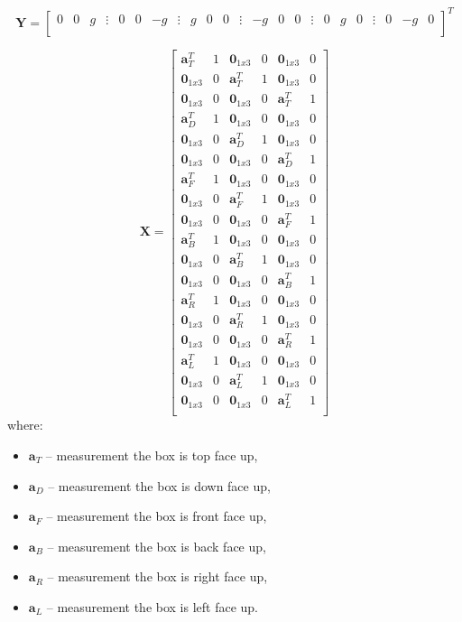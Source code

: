 \begin{equation}
	\bm{Y} = \begin{bmatrix} 0 & 0 & g & \vdots & 0 & 0 & -g & \vdots & g & 0 & 0 & \vdots & -g & 0 & 0  & \vdots& 0 & g & 0 & \vdots & 0 & -g & 0 \\
	\end{bmatrix}^T
	\label{ols_y}
\end{equation}

\begin{equation}
	\bm{X} = 
	\begin{bmatrix}
	\bm{a}^T_T & 1 & \bm{0}_{1x3} & 0 & \bm{0}_{1x3} & 0\\
	\bm{0}_{1x3} & 0 & \bm{a}^T_T & 1 & \bm{0}_{1x3} & 0\\
	\bm{0}_{1x3} & 0 & \bm{0}_{1x3} & 0 & \bm{a}^T_T & 1\\
	
	\bm{a}^T_D & 1 & \bm{0}_{1x3} & 0 & \bm{0}_{1x3} & 0\\
	\bm{0}_{1x3} & 0 & \bm{a}^T_D & 1 & \bm{0}_{1x3} & 0\\
	\bm{0}_{1x3} & 0 & \bm{0}_{1x3} & 0 & \bm{a}^T_D & 1\\
	
	\bm{a}^T_F & 1 & \bm{0}_{1x3} & 0 & \bm{0}_{1x3} & 0\\
	\bm{0}_{1x3} & 0 & \bm{a}^T_F & 1 & \bm{0}_{1x3} & 0\\
	\bm{0}_{1x3} & 0 & \bm{0}_{1x3} & 0 & \bm{a}^T_F & 1\\
	
	\bm{a}^T_B & 1 & \bm{0}_{1x3} & 0 & \bm{0}_{1x3} & 0\\
	\bm{0}_{1x3} & 0 & \bm{a}^T_B & 1 & \bm{0}_{1x3} & 0\\
	\bm{0}_{1x3} & 0 & \bm{0}_{1x3} & 0 & \bm{a}^T_B & 1\\
	
	\bm{a}^T_R & 1 & \bm{0}_{1x3} & 0 & \bm{0}_{1x3} & 0\\
	\bm{0}_{1x3} & 0 & \bm{a}^T_R & 1 & \bm{0}_{1x3} & 0\\
	\bm{0}_{1x3} & 0 & \bm{0}_{1x3} & 0 & \bm{a}^T_R & 1\\
	
	\bm{a}^T_L & 1 & \bm{0}_{1x3} & 0 & \bm{0}_{1x3} & 0\\
	\bm{0}_{1x3} & 0 & \bm{a}^T_L & 1 & \bm{0}_{1x3} & 0\\
	\bm{0}_{1x3} & 0 & \bm{0}_{1x3} & 0 & \bm{a}^T_L & 1\\
	\end{bmatrix} 
	\label{ols_x}
\end{equation}
where:
\begin{itemize}
	\item $\bm{a}_T$ -- measurement the box is top face up,
	\item $\bm{a}_D$ -- measurement the box is down face up,
	\item $\bm{a}_F$ -- measurement the box is front face up,
	\item $\bm{a}_B$ -- measurement the box is back face up,
	\item $\bm{a}_R$ -- measurement the box is right face up,
	\item $\bm{a}_L$ -- measurement the box is left face up.
\end{itemize}

